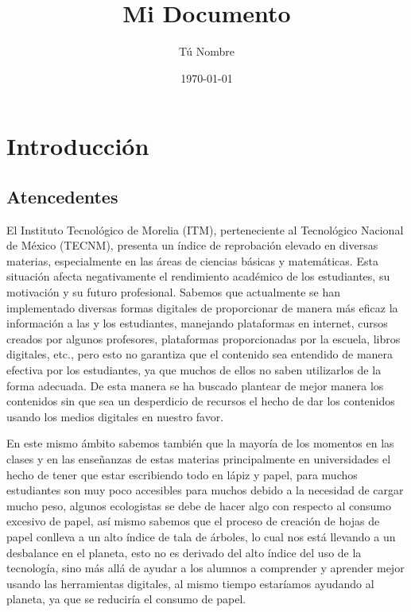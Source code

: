 \documentclass{article}
\title{Mi Documento}
\author{Tú Nombre}
\date{\today}
\begin{document}

\tableofcontents
\clearpage

\section{Introducción}

\subsection{Atencedentes}

El Instituto Tecnológico de Morelia (ITM), perteneciente al Tecnológico Nacional de México (TECNM), presenta un índice de reprobación elevado en diversas materias, especialmente en las áreas de ciencias básicas y matemáticas. Esta situación afecta negativamente el rendimiento académico de los estudiantes, su motivación y su futuro profesional.
Sabemos que actualmente se han implementado diversas formas digitales de proporcionar de manera más eficaz la información a las y los estudiantes, manejando plataformas en internet, cursos creados por algunos profesores, plataformas proporcionadas por la escuela, libros digitales, etc., pero esto no garantiza que el contenido sea entendido de manera efectiva por los estudiantes, ya que muchos de ellos no saben utilizarlos de la forma adecuada.
De esta manera se ha buscado plantear de mejor manera los contenidos sin que sea un desperdicio de recursos el hecho de dar los contenidos usando los medios digitales en nuestro favor. 

En este mismo ámbito sabemos también que la mayoría de los momentos en las clases y en las enseñanzas de estas materias principalmente en universidades el hecho de tener que estar escribiendo todo en lápiz y papel, para muchos estudiantes son muy poco accesibles para muchos debido a la necesidad de cargar mucho peso, algunos ecologistas se debe de hacer algo con respecto al consumo excesivo de papel, así mismo sabemos que el proceso de creación de hojas de papel conlleva a un alto índice de tala de árboles, lo cual nos está llevando a un desbalance en el planeta, esto no es derivado del alto índice del uso de la tecnología, sino más allá de ayudar a los alumnos a comprender y aprender mejor usando las herramientas digitales, al mismo tiempo estaríamos ayudando al planeta, ya que se reduciría el consumo de papel.
\end{document}
